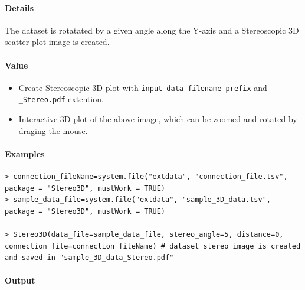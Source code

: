 \documentclass[]{article}
\providecommand{\tightlist}{%
  \setlength{\itemsep}{0pt}\setlength{\parskip}{0pt}}
\let\oldparagraph\paragraph
\renewcommand{\paragraph}[1]{\oldparagraph{#1}\mbox{}}
\begin{document}
\paragraph{\texorpdfstring{\textbf{Details}}{Details}}\label{details}

The dataset is rotatated by a given angle along the Y-axis and a
Stereoscopic 3D scatter plot image is created.

\paragraph{\texorpdfstring{\textbf{Value}}{Value}}\label{value}

\begin{itemize}
\tightlist
\item
  Create Stereoscopic 3D plot with
  \texttt{input\ data\ filename\ prefix} and \texttt{\_Stereo.pdf}
  extention.
\item
  Interactive 3D plot of the above image, which can be zoomed and rotated by draging the mouse.
\end{itemize}

\paragraph{\texorpdfstring{\textbf{Examples}}{Examples}}\label{examples}

\begin{verbatim}
> connection_fileName=system.file("extdata", "connection_file.tsv",
package = "Stereo3D", mustWork = TRUE)
> sample_data_file=system.file("extdata", "sample_3D_data.tsv",
package = "Stereo3D", mustWork = TRUE)

> Stereo3D(data_file=sample_data_file, stereo_angle=5, distance=0,
connection_file=connection_fileName) # dataset stereo image is created
and saved in "sample_3D_data_Stereo.pdf"
\end{verbatim}

\paragraph{Output}\label{output}
\end{document}
